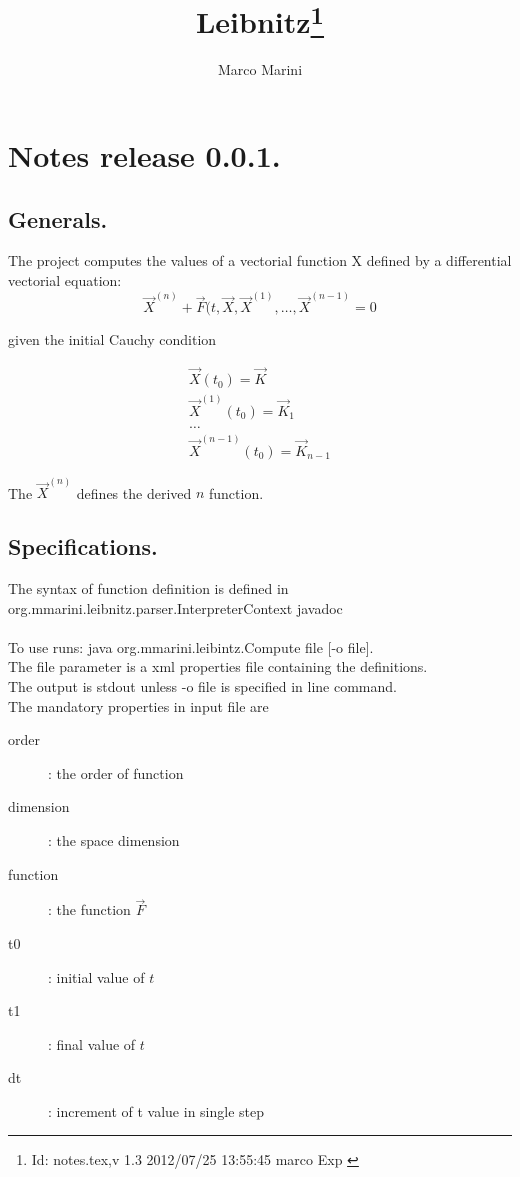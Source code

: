 \documentclass[a4paper,twoside]{article}
\begin{document}
\newtheorem{theorem}{Teorema}
\title{Leibnitz\thanks{$ $Id: notes.tex,v 1.3 2012/07/25 13:55:45 marco Exp $ $ }}
\author{Marco Marini}
\maketitle
\tableofcontents
\pagebreak

\section{Notes release 0.0.1.}

\subsection{Generals.}
The project computes the values of a vectorial function X defined by
a differential vectorial equation:
\begin{equation}
\vec X^{(n)} +\vec F(t, \vec X, \vec X^{(1)}, \dots, \vec X^{(n-1)} = 0
\end{equation}

given the initial Cauchy condition

\begin{equation}
\begin{array}{l}
\vec X(t_0) = \vec K
\\
\vec X^{(1)}(t_0) = \vec K_1
\\
\dots
\\
\vec X^{(n-1)}(t_0) = \vec K_{n-1}
\end{array}
\end{equation}

The $\vec X^{(n)}$ defines the derived $n$ function.

\subsection{Specifications.}

The syntax of function definition is defined in org.mmarini.leibnitz.parser.InterpreterContext javadoc
\\
\\
To use runs: java org.mmarini.leibintz.Compute file [-o file].
\\
The file parameter is a xml properties file containing the definitions.
\\
The output is stdout unless -o file is specified in line command.
\\

The mandatory properties in input file are
\begin{description}
	\item[order]: the order of function
	\item[dimension]: the space dimension
	\item[function]: the function $\vec F$
	\item[t0]: initial value of $t$
	\item[t1]: final value of $t$
	\item[dt]: increment of t value in single step
\end{description}
\end{document}
